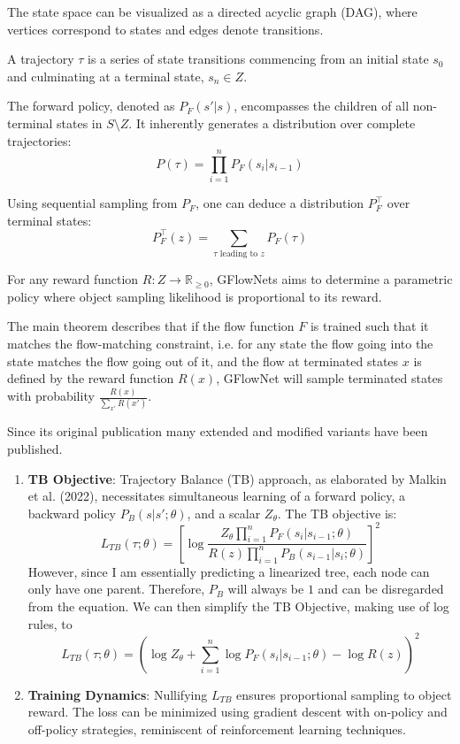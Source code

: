 The state space can be visualized as a directed acyclic graph (DAG), where vertices correspond to states and edges denote transitions.

A trajectory $\tau$ is a series of state transitions commencing from an initial state $s_0$ and culminating at a terminal state, $s_n \in Z$.

The forward policy, denoted as $P_F(s'|s)$, encompasses the children of all non-terminal states in $S \setminus Z$. It inherently generates a distribution over complete trajectories:
\[ P(\tau) = \prod_{i=1}^{n} P_F(s_i|s_{i-1}) \]


Using sequential sampling from $P_F$, one can deduce a distribution $P^{\top}_F$ over terminal states:
\[ P^{\top}_F(z) = \sum_{\tau \text{ leading to } z} P_F(\tau) \]

For any reward function $R: Z \rightarrow \mathbb{R}_{\geq 0}$, GFlowNets aims to determine a parametric policy where object sampling likelihood is proportional to its reward.

The main theorem describes that if the flow function $F$ is trained such that it matches the flow-matching constraint, i.e. for any state the flow going into the state matches the flow going out of it, and the flow at terminated states $x$ is defined by the reward function $R(x)$, GFlowNet will sample terminated states with probability $\frac{R(x)}{\sum_{x\prime} R(x\prime)}$.


Since its original publication many extended and modified variants have been published.


\begin{enumerate}
    \item \textbf{TB Objective}: Trajectory Balance (TB) approach, as elaborated by Malkin et al. (2022), necessitates simultaneous learning of a forward policy, a backward policy $P_B(s|s'; \theta)$, and a scalar $Z_\theta$. The TB objective is:
    \[ L_{TB}(\tau;\theta) = \left[\log\frac{Z_\theta \prod_{i=1}^{n} P_F(s_i|s_{i-1};\theta)}{R(z) \prod_{i=1}^{n} P_B(s_{i-1}|s_i;\theta)}\right]^2 \] However, since I am essentially predicting a linearized tree, each node can only have one parent. Therefore, $P_B$ will always be $1$ and can be disregarded from the equation. We can then simplify the TB Objective, making use of log rules, to \[ L_{TB}(\tau;\theta) = \left(\log Z_\theta + \sum_{i=1}^{n} \log P_F(s_i|s_{i-1};\theta) - \log R(z)\right)^2 \]
    
    \item \textbf{Training Dynamics}: Nullifying $L_{TB}$ ensures proportional sampling to object reward. The loss can be minimized using gradient descent with on-policy and off-policy strategies, reminiscent of reinforcement learning techniques.
    
\end{enumerate}














